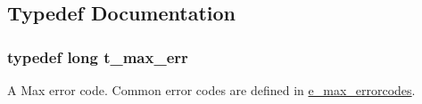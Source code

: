 \subsection{Typedef Documentation}
\hypertarget{group__datatypes_ga73edaae82b318855cc09fac994918165}{
\subsubsection[{t\_\-max\_\-err}]{\setlength{\rightskip}{0pt plus 5cm}typedef long {\bf t\_\-max\_\-err}}}
\label{group__datatypes_ga73edaae82b318855cc09fac994918165}


A Max error code. Common error codes are defined in \hyperlink{group__misc_ga0764dd6c02b76cca7d053ae50555d69d}{e\_\-max\_\-errorcodes}. 